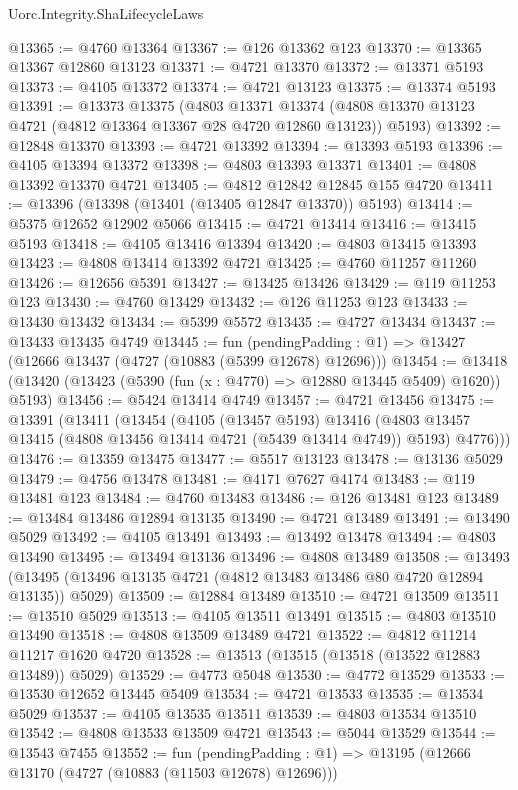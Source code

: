 \begin{lexlean}{Uorc.Integrity.ShaLifecycleLaws}
\begin{coremodule}
@13365 := @4760 @13364
@13367 := @126 @13362 @123
@13370 := @13365 @13367 @12860 @13123
@13371 := @4721 @13370
@13372 := @13371 @5193
@13373 := @4105 @13372
@13374 := @4721 @13123
@13375 := @13374 @5193
@13391 := @13373
    @13375
    (@4803
      @13371
      @13374
      (@4808 @13370 @13123 @4721 (@4812 @13364 @13367 @28 @4720 @12860 @13123))
      @5193)
@13392 := @12848 @13370
@13393 := @4721 @13392
@13394 := @13393 @5193
@13396 := @4105 @13394 @13372
@13398 := @4803 @13393 @13371
@13401 := @4808 @13392 @13370 @4721
@13405 := @4812 @12842 @12845 @155 @4720
@13411 := @13396 (@13398 (@13401 (@13405 @12847 @13370)) @5193)
@13414 := @5375 @12652 @12902 @5066
@13415 := @4721 @13414
@13416 := @13415 @5193
@13418 := @4105 @13416 @13394
@13420 := @4803 @13415 @13393
@13423 := @4808 @13414 @13392 @4721
@13425 := @4760 @11257 @11260
@13426 := @12656 @5391
@13427 := @13425 @13426
@13429 := @119 @11253 @123
@13430 := @4760 @13429
@13432 := @126 @11253 @123
@13433 := @13430 @13432
@13434 := @5399 @5572
@13435 := @4727 @13434
@13437 := @13433 @13435 @4749
@13445 := fun (pendingPadding : @1) => @13427 (@12666 @13437 (@4727 (@10883 (@5399 @12678) @12696)))
@13454 := @13418 (@13420 (@13423 (@5390 (fun (x : @4770) => @12880 @13445 @5409) @1620)) @5193)
@13456 := @5424 @13414 @4749
@13457 := @4721 @13456
@13475 := @13391
    (@13411
      (@13454
        (@4105
          (@13457 @5193)
          @13416
          (@4803 @13457 @13415 (@4808 @13456 @13414 @4721 (@5439 @13414 @4749)) @5193)
          @4776)))
@13476 := @13359 @13475
@13477 := @5517 @13123
@13478 := @13136 @5029
@13479 := @4756 @13478
@13481 := @4171 @7627 @4174
@13483 := @119 @13481 @123
@13484 := @4760 @13483
@13486 := @126 @13481 @123
@13489 := @13484 @13486 @12894 @13135
@13490 := @4721 @13489
@13491 := @13490 @5029
@13492 := @4105 @13491
@13493 := @13492 @13478
@13494 := @4803 @13490
@13495 := @13494 @13136
@13496 := @4808 @13489
@13508 := @13493 (@13495 (@13496 @13135 @4721 (@4812 @13483 @13486 @80 @4720 @12894 @13135)) @5029)
@13509 := @12884 @13489
@13510 := @4721 @13509
@13511 := @13510 @5029
@13513 := @4105 @13511 @13491
@13515 := @4803 @13510 @13490
@13518 := @4808 @13509 @13489 @4721
@13522 := @4812 @11214 @11217 @1620 @4720
@13528 := @13513 (@13515 (@13518 (@13522 @12883 @13489)) @5029)
@13529 := @4773 @5048
@13530 := @4772 @13529
@13533 := @13530 @12652 @13445 @5409
@13534 := @4721 @13533
@13535 := @13534 @5029
@13537 := @4105 @13535 @13511
@13539 := @4803 @13534 @13510
@13542 := @4808 @13533 @13509 @4721
@13543 := @5044 @13529
@13544 := @13543 @7455
@13552 := fun (pendingPadding : @1) =>
  @13195 (@12666 @13170 (@4727 (@10883 (@11503 @12678) @12696)))

\end{coremodule}
\end{lexlean}
